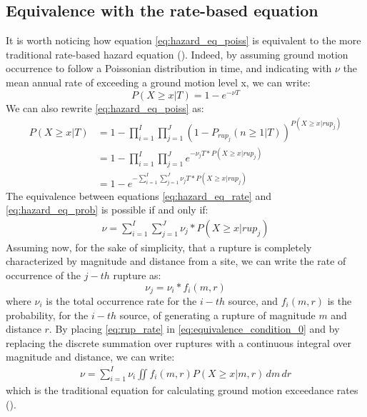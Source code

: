 \subsection{Equivalence with the rate-based equation}
It is worth noticing how equation \ref{eq:hazard_eq_poiss} is equivalent to the more traditional rate-based
hazard equation (\cite{mcguire1995}). Indeed, by assuming ground motion occurrence to follow a Poissonian
distribution in time, and indicating with $\nu$ the mean annual rate of exceeding a ground motion level x,
we can write:
\begin{equation}
\label{eq:hazard_eq_rate}
P(X \ge x | T) = 1 - e ^ {- \nu T}
\end{equation}
We can also rewrite \ref{eq:hazard_eq_poiss} as:
\begin{align}
\label{eq:hazard_eq_prob}
P(X \ge x | T) &= 1 - \prod_{i=1}^{I} \prod_{j=1}^{J} (1 - P_{rup_{j}}(n \ge 1 | T))^{P(X \ge x | rup_{j})} \nonumber \\
		      &= 1 - \prod_{i=1}^{I} \prod_{j=1}^{J} e^{-\nu_{j} T * P(X \ge x | rup_{j})} \nonumber \\
		      & = 1 - e ^ {- \sum_{i=1}^{I} \sum_{j=1}^{J} \nu_{j} T * P(X \ge x | rup_{j})}
\end{align}
The equivalence between equations \ref{eq:hazard_eq_rate} and \ref{eq:hazard_eq_prob} is possible if and only if:
\begin{align}
\label{eq:equivalence_condition_0}
\nu  =  \sum_{i=1}^{I} \sum_{j=1}^{J} \nu_{j} * P(X \ge x | rup_{j})
\end{align}
Assuming now, for the sake of simplicity, that a rupture is completely characterized by magnitude and distance from a site, we
can write the rate of occurrence of the $j-th$ rupture as:
\begin{equation}
\label{eq:rup_rate}
\nu_{j} = \nu_{i} * f_{i}(m, r)
\end{equation}
where $\nu_{i}$ is the total occurrence rate for the $i-th$ source, and $f_{i}(m, r)$ is the probability, for the $i-th$ source, of
generating a rupture of magnitude $m$ and distance $r$. By placing \ref{eq:rup_rate} in \ref{eq:equivalence_condition_0} and
by replacing the discrete summation over ruptures with a continuous integral over magnitude and distance, we can write:
\begin{align}
\nu = \sum_{i=1}^{I} \nu_{i} \iint f_{i}(m, r) P(X \ge x | m, r)\,dm \,dr
\end{align}
which is the traditional equation for calculating ground motion exceedance rates (\cite{mcguire1995}).

